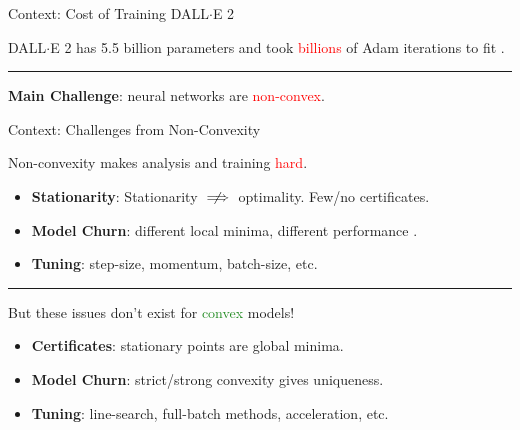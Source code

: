 \documentclass[usenames,dvipsnames,mathserif,notheorems]{beamer}
\newcommand{\horizontalrule}{
	{
			\vspace{-0.5em}
			\center \rule{\textwidth}{0.1em}
			\vspace{-0.2em}
		}
}
\newcommand{\red}[1]{\textcolor{Red}{#1}}
\newcommand{\green}[1]{\textcolor{ForestGreen}{#1}}
\begin{document}
\begin{frame}{Context: Cost of Training DALL$\cdot$E 2}

	\begin{center}
		\Large
		DALL$\cdot$E 2 has 5.5 billion parameters and took \red{billions} of Adam
		iterations to fit \citep{ramesh2022dalle}.
	\end{center}

	\pause
	\horizontalrule

	\begin{center}
		\Large
		\textbf{Main Challenge}: neural networks are \textcolor{red}{non-convex}.
	\end{center}


	\begin{figure}[]
		\centering
		
	\end{figure}

\end{frame}

\begin{frame}{Context: Challenges from Non-Convexity}
	\begin{center}
		\Large
		Non-convexity makes analysis and training \red{hard}.
	\end{center}

	\pause
	\begin{itemize}
		\item \textbf{Stationarity}: Stationarity \( \centernot \implies \) optimality.
		      Few/no certificates.

		      \pause
		\item \textbf{Model Churn}: different local minima,
		      different performance \citep{henderson2018deep}.

		      \pause
		\item \textbf{Tuning}: step-size, momentum, batch-size, etc.
	\end{itemize}

	\pause
	\horizontalrule

	\vspace{-2ex}

	\begin{center}
		\Large
		But these issues don't exist for \green{convex} models!
	\end{center}

	\pause
	\begin{itemize}
		\item \textbf{Certificates}: stationary points are global minima.

		      \pause
		\item \textbf{Model Churn}: strict/strong convexity gives uniqueness.

		      \pause
		\item \textbf{Tuning}: line-search, full-batch methods, acceleration, etc.
	\end{itemize}

\end{frame}
\end{document}
